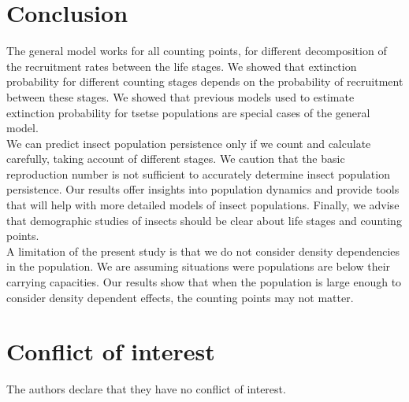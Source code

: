  



\section{Conclusion}

The general model works for all counting points, for different decomposition of the recruitment rates between the life stages. We showed that extinction probability for different counting stages depends on the probability of recruitment between these stages. We showed that previous models used to estimate extinction probability for tsetse populations are special cases of the general model. \\

We can predict insect population persistence only if we count and calculate carefully, taking account of different stages. We caution that the basic reproduction number is not sufficient to accurately determine insect population persistence. Our results offer insights into population dynamics and provide tools that will help with more detailed models of insect populations. Finally, we advise that demographic studies of insects should be clear about life stages and counting points.\\

A limitation of the present study is that we do not consider density dependencies in the population. We are assuming situations were populations are below their carrying capacities. Our results show that when the population is large enough to consider density dependent effects, the counting points may not matter.







%
 \section*{Conflict of interest}
%
 The authors declare that they have no conflict of interest.



\nocite{*}
%
%



